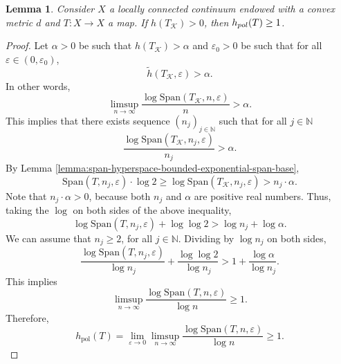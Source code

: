 \documentclass[sn-mathphys-num]{sn-jnl}%
\theoremstyle{thmstyleone}%
\newtheorem{lemma}{Lemma}
\theoremstyle{thmstyletwo}%
\theoremstyle{thmstylethree}%
\newcommand*\induce[1]{#1_\mathcal{K}}
\begin{document}
\begin{lemma}\label{lemma:positive-entropy-induced-hyperspace-poly-entropy-one}
    Consider $X$ a locally connected continuum endowed with a convex metric $d$ and $T: X \to X$ a map. If $h(\induce{T}) > 0$, then $h_{\emph{pol}}(T) \geq 1$.
\end{lemma}
\begin{proof}
    Let $\alpha > 0$ be such that $h(\induce{T}) > \alpha$ and $\varepsilon_0 > 0$ be such that for all $\varepsilon \in (0, \varepsilon_0)$,
    \begin{equation*}
        \widetilde{h}(\induce{T}, \varepsilon) > \alpha. 
    \end{equation*}
    In other words, 
    \begin{equation*}
        \limsup\limits_{n \to \infty} \frac{\log \text{Span}(\induce{T}, n, \varepsilon)}{n} > \alpha.
    \end{equation*}
    This implies that there exists sequence $(n_j)_{j \in \mathbb{N}}$ such that for all $j \in \mathbb{N}$
    \begin{equation*}
        \frac{\log \text{Span}(\induce{T}, n_j, \varepsilon)}{n_j} > \alpha.
    \end{equation*}
    By Lemma \ref{lemma:span-hyperspace-bounded-exponential-span-base}, 
    \begin{equation*}
        \text{Span}(T, n_j, \varepsilon)\cdot\log 2 \geq \log \text{Span}(\induce{T}, n_j, \varepsilon) > n_j\cdot\alpha.
    \end{equation*}
    Note that $n_j \cdot \alpha > 0$, because both $n_j$ and $\alpha$ are positive real numbers. Thus, taking the $\log$ on both sides of the above inequality,
    \begin{equation*}
        \log \text{Span}(T, n_j, \varepsilon) + \log\log 2 > \log n_j + \log\alpha.
    \end{equation*}
    We can assume that $n_j \geq 2$, for all $j \in \mathbb{N}$. Dividing by $\log n_j$ on both sides,
    \begin{equation*}
        \frac{\log \text{Span}(T, n_j, \varepsilon)}{\log n_j} + \frac{\log\log 2}{\log n_j} > 1 + \frac{\log\alpha}{\log n_j}.
    \end{equation*}
    This implies
    \begin{equation*}
        \limsup\limits_{n \to \infty} \frac{\log \text{Span}(T, n, \varepsilon)}{\log n} \geq 1.
    \end{equation*}
    Therefore,
    \begin{equation*}
        h_{\text{pol}}(T) = \lim\limits_{\varepsilon \to 0}\limsup\limits_{n \to \infty} \frac{\log \text{Span}(T, n, \varepsilon)}{\log n} \geq 1.
    \end{equation*}
\end{proof}
\end{document}
